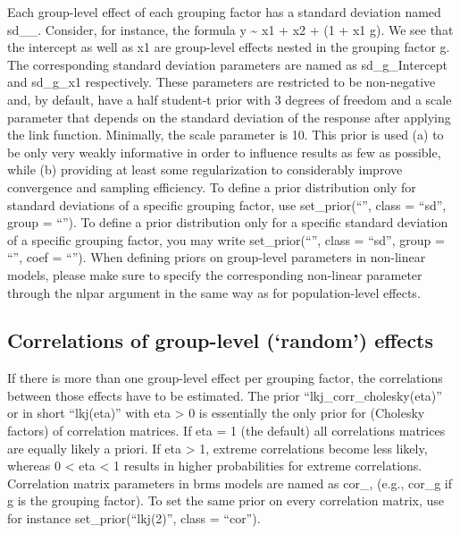 \documentclass[]{book}
\begin{document}
Each group-level effect of each grouping factor has a standard deviation
named sd\_\_. Consider, for instance, the formula y \textasciitilde{} x1
+ x2 + (1 + x1 \textbar{} g). We see that the intercept as well as x1
are group-level effects nested in the grouping factor g. The
corresponding standard deviation parameters are named as
sd\_g\_Intercept and sd\_g\_x1 respectively. These parameters are
restricted to be non-negative and, by default, have a half student-t
prior with 3 degrees of freedom and a scale parameter that depends on
the standard deviation of the response after applying the link function.
Minimally, the scale parameter is 10. This prior is used (a) to be only
very weakly informative in order to influence results as few as
possible, while (b) providing at least some regularization to
considerably improve convergence and sampling efficiency. To define a
prior distribution only for standard deviations of a specific grouping
factor, use set\_prior(``'', class = ``sd'', group = ``''). To define a
prior distribution only for a specific standard deviation of a specific
grouping factor, you may write set\_prior(``'', class = ``sd'', group =
``'', coef = ``''). When defining priors on group-level parameters in
non-linear models, please make sure to specify the corresponding
non-linear parameter through the nlpar argument in the same way as for
population-level effects.

\subsection{\texorpdfstring{Correlations of group-level (`random')
effects}{Correlations of group-level (random) effects}}\label{correlations-of-group-level-random-effects}

If there is more than one group-level effect per grouping factor, the
correlations between those effects have to be estimated. The prior
``lkj\_corr\_cholesky(eta)'' or in short ``lkj(eta)'' with eta
\textgreater{} 0 is essentially the only prior for (Cholesky factors) of
correlation matrices. If eta = 1 (the default) all correlations matrices
are equally likely a priori. If eta \textgreater{} 1, extreme
correlations become less likely, whereas 0 \textless{} eta \textless{} 1
results in higher probabilities for extreme correlations. Correlation
matrix parameters in brms models are named as cor\_, (e.g., cor\_g if g
is the grouping factor). To set the same prior on every correlation
matrix, use for instance set\_prior(``lkj(2)'', class = ``cor'').
\end{document}

